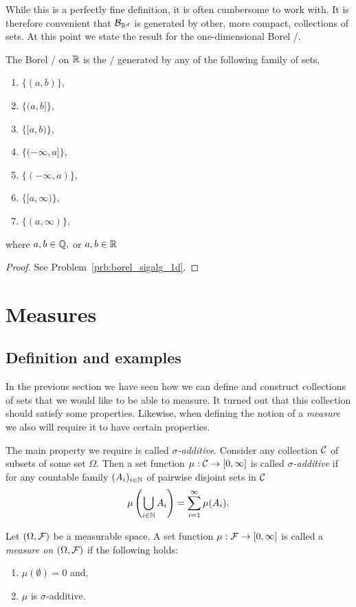 While this is a perfectly fine definition, it is often cumbersome to work with. It is therefore convenient that $\mathcal B_{\mathbb R^d}$ is generated by other, more compact, collections of sets. At this point we state the result for the one-dimensional Borel \sigalg/. 

\begin{proposition}\label{prop:characterization_borel_sigalg_1d}
The Borel \sigalg/ on $\mathbb R$ is the \sigalg/ generated by any of the following family of sets, 
\begin{enumerate}
\item $\{(a, b)\}$,
\item $\{(a, b]\}$,
\item $\{[a, b)\}$,
\item $\{(-\infty,a]\}$,
\item $\{(-\infty,a)\}$,
\item $\{[a, \infty)\}$,
\item $\{(a,\infty)\}$,
\end{enumerate}
where $a, b \in \mathbb Q,$ or $a, b \in \mathbb R$
\end{proposition}

\begin{proof}
See Problem~\ref{prb:borel_sigalg_1d}.
\end{proof}

\section{Measures}

\subsection{Definition and examples}
In the previous section we have seen how we can define and construct collections of sets that we would like to be able to measure. It turned out that this collection should satisfy some properties. Likewise, when defining the notion of a \emph{measure} we also will require it to have certain properties.

The main property we require is called \emph{$\sigma$-additive}. Consider any collection $\mathcal C$ of subsets of some set $\Omega$. Then a set function $\mu : \mathcal C \to [0,\infty]$ is called \emph{$\sigma$-additive} if for any countable family $(A_i)_{i \in \mathbb N}$ of pairwise disjoint sets in $\mathcal C$
\[
	\mu\left(\bigcup_{i \in \mathbb N} A_i\right) = \sum_{i = 1}^\infty \mu(A_i).
\]

\begin{definition}[Measure]\label{def:measure}
Let $(\Omega, \mathcal F)$ be a measurable space. A set function $\mu : \mathcal F \to [0,\infty]$ is called a \emph{measure on $(\Omega, \mathcal F)$} if the following holds:
\begin{enumerate}
\item $\mu(\emptyset) = 0$ and,
\item $\mu$ is $\sigma$-additive.
\end{enumerate}
\end{definition}


